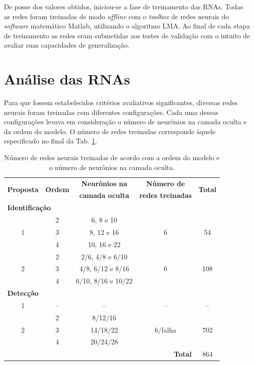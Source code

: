 De posse dos valores obtidos, iniciou-se a fase de treinamento das RNAs. Todas
as redes foram treinadas de modo {\it offline} com o {\it toolbox} de redes
neurais do {\it software} matemático Matlab\reg, utilizando o algoritmo LMA. Ao
final de cada etapa de treinamento as redes eram submetidas aos testes de
validação com o intuito de avaliar suas capacidades de generalização.

\section{Análise das RNAs}
Para que fossem estabelecidos critérios avaliativos significantes, diversas
redes neurais foram treinadas com diferentes configurações. Cada uma dessas
configurações levava em consideração o número de neurônios na camada oculta e da
ordem do modelo. O número de redes treinadas corresponde àquele especificado no
final da Tab. \ref{tab:treinamentos}. 

\begin{table}[htb]
\small
\centering
\caption[Número de redes neurais treinadas]{Número de redes neurais treinadas de
acordo com a ordem do modelo e o número de neurônios na camada oculta.}
\label{tab:treinamentos}
\vspace{0.25cm}
\begin{tabular}{|c|c|c|c|c|}
\hline
\multirow{2}{*}{\bf Proposta} & 
\multirow{2}{*}{\bf Ordem} & 
{\bf Neurônios na} & 
{\bf Número de} & 
\multirow{2}{*}{\bf Total}\\
& & {\bf camada oculta} & {\bf redes treinadas} &\\
\hline
\hline
\multicolumn{5}{|l|}{{\bf Identificação}}\\
\hline
\multirow{3}{*}{1} & 2 & 6, 8 e 10 & \multirow{3}{*}{6} & \multirow{3}{*}{54}\\
\cline{2-3}
& 3 & 8, 12 e 16 & &\\
\cline{2-3}
& 4 & 10, 16 e 22 & &\\
\hline
\multirow{3}{*}{2} & 2 & 2/6, 4/8 e 6/10 & 
\multirow{3}{*}{6} & \multirow{3}{*}{108}\\
\cline{2-3}
& 3 & 4/8, 6/12 e 8/16 & & \\
\cline{2-3}
& 4 & 6/10, 8/16 e 10/22 & & \\
\hline
\multicolumn{5}{|l|}{{\bf Detecção}}\\
\hline
1 & -- & -- & -- & --\\
\hline
\multirow{3}{*}{2} & 
2 & 8/12/16 & 
\multirow{3}{*}{6/falha} &
\multirow{3}{*}{702}\\
\cline{2-3}
& 3 & 14/18/22 & &\\
\cline{2-3}
& 4 & 20/24/28 & &\\
\hline
\hline
\multicolumn{4}{|r|}{{\bf Total}} & 864\\
\hline
\end{tabular}
\end{table}

